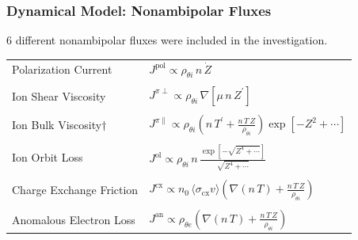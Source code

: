 \documentclass[10pt]{beamer}
\begin{document}
\begin{frame} %
\frametitle{Dynamical Model: Nonambipolar Fluxes}
6 different nonambipolar fluxes were included in the investigation.
\parencite{stringer_explanation_1993} \parencite{itoh_role_1996} \parencite{toda_theoretical_1997} \parencite{staps_backstepping_2017} \\
\begin{center}
\begin{tabular}{l|l} \hline
	Polarization Current & $J^\text{pol} \propto \rho_{\theta i}\, n \, \dot{Z}$ \\ \\
	Ion Shear Viscosity & $J^{\pi\perp} \propto \rho_{\theta i} \,
		\nabla\left[\mu \, n \, Z^\prime\right]$ \\ \\
	Ion Bulk Viscosity$\dagger$ & $J^{\pi\parallel} \propto \rho_{\theta i}
		\left(n\,T^\prime + \frac{n\,T\,Z}{\rho_{\theta i}}\right)
		\exp\left[-Z^2 + \dotsb\right]$ \\ \\
	Ion Orbit Loss & $J^\text{ol} \propto \rho_{\theta i} \, n \,
		\frac{\exp\left[-\sqrt{Z^4 + \dotsb}\right]}{\sqrt{Z^4 + \dotsb}}$ \\ \\
	Charge Exchange Friction & $J^\text{cx} \propto n_0 \,
		\langle \sigma_\text{cx} v\rangle \left(\nabla (n\,T) +
		\frac{n\,T\,Z}{\rho_{\theta i}}\right)$ \\ \\
	Anomalous Electron Loss & $J^\text{an} \propto \rho_{\theta e}
		\left(\nabla (n\,T) + \frac{n\,T\,Z}{\rho_{\theta i}}\right)$

\end{tabular}
\end{center}
\end{frame}
\end{document}
